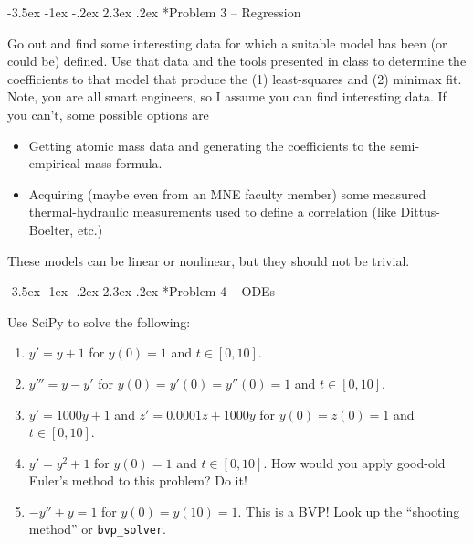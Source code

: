 \documentclass[11pt]{article}
\makeatletter
\renewcommand\section{\@startsection{section}{1}{\z@}%
                                  {-3.5ex \@plus -1ex \@minus -.2ex}%
                                  {2.3ex \@plus.2ex}%
                                  {\normalfont\bfseries}}
\makeatother
\begin{document}
\section*{Problem 3 -- Regression}

Go out and find some interesting data for which a suitable model has been (or could be) defined.  Use that data and the tools presented in class to determine the coefficients to that model that produce the (1) least-squares and (2) minimax fit.  \\

Note, you are all smart engineers, so I assume you can find interesting data.  If you can't, some possible options are
\begin{itemize}
 \item Getting atomic mass data and generating the coefficients to the semi-empirical mass formula.
 \item Acquiring (maybe even from an MNE faculty member) some measured thermal-hydraulic measurements used to define a correlation (like Dittus-Boelter, etc.)
\end{itemize}
These models can be linear or nonlinear, but they should not be trivial.




\section*{Problem 4 -- ODEs}

Use SciPy to solve the following:
\begin{enumerate}
 \item $y' = y + 1$ for $y(0) = 1$ and $t \in [0, 10]$.
 \item $y''' = y - y'$ for $y(0)=y'(0)=y''(0)=1$ and $t \in [0, 10]$.
 \item $y' = 1000 y + 1$ and $z' = 0.0001 z + 1000 y$ for $y(0) = z(0) = 1$ and $t \in [0, 10]$.
 \item $y' = y^2 + 1$ for $y(0) = 1$ and $t \in [0, 10]$.  How would you apply good-old Euler's method to this problem?  Do it!
 \item $-y'' + y = 1$ for $y(0) = y(10) = 1$.  This is a BVP!  Look up the ``shooting method'' or {\tt bvp\_solver}. 
\end{enumerate}
\end{document}
